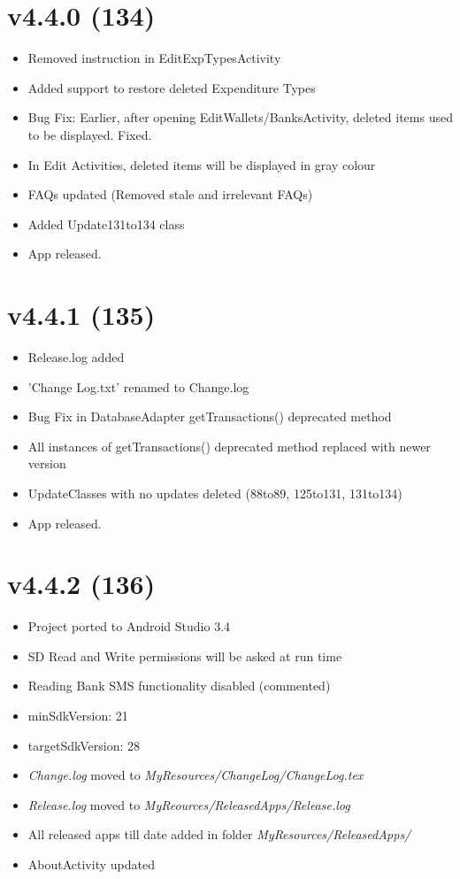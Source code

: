 \documentclass{article}
\begin{document}
\section{v4.4.0 (134)}
\begin{itemize}
\item Removed instruction in EditExpTypesActivity
\item Added support to restore deleted Expenditure Types
\item Bug Fix: Earlier, after opening EditWallets/BanksActivity, deleted items used to be displayed. Fixed.
\item In Edit Activities, deleted items will be displayed in gray colour
\item FAQs updated (Removed stale and irrelevant FAQs)
\item Added Update131to134 class
\item App released.
\end{itemize}

\section{v4.4.1 (135)}
\begin{itemize}
\item Release.log added
\item 'Change Log.txt' renamed to Change.log
\item Bug Fix in DatabaseAdapter getTransactions() deprecated method
\item All instances of getTransactions() deprecated method replaced with newer version
\item UpdateClasses with no updates deleted (88to89, 125to131, 131to134)
\item App released.
\end{itemize}

\section{v4.4.2 (136)}
\begin{itemize}
\item Project ported to Android Studio 3.4
\item SD Read and Write permissions will be asked at run time
\item Reading Bank SMS functionality disabled (commented)
\item minSdkVersion: 21
\item targetSdkVersion: 28
\item \textit{Change.log} moved to \textit{MyResources/ChangeLog/ChangeLog.tex}
\item \textit{Release.log} moved to \textit{MyReources/ReleasedApps/Release.log}
\item All released apps till date added in folder \textit{MyResources/ReleasedApps/}
\item AboutActivity updated
\end{itemize}
\end{document}
